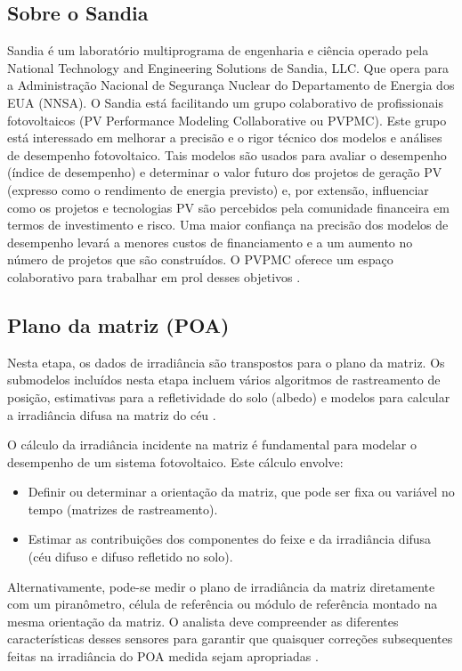 \subsection{Sobre o Sandia}

Sandia é um laboratório multiprograma de engenharia e ciência operado pela National Technology and Engineering Solutions de Sandia, LLC. Que opera para a Administração Nacional de Segurança Nuclear do Departamento de Energia dos EUA (NNSA). O Sandia está facilitando um grupo colaborativo de profissionais fotovoltaicos (PV Performance Modeling Collaborative ou PVPMC). Este grupo está interessado em melhorar a precisão e o rigor técnico dos modelos e análises de desempenho fotovoltaico. Tais modelos são usados para avaliar o desempenho (índice de desempenho) e determinar o valor futuro dos projetos de geração PV (expresso como o rendimento de energia previsto) e, por extensão, influenciar como os projetos e tecnologias PV são percebidos pela comunidade financeira em termos de investimento e risco. Uma maior confiança na precisão dos modelos de desempenho levará a menores custos de financiamento e a um aumento no número de projetos que são construídos. O PVPMC oferece um espaço colaborativo para trabalhar em prol desses objetivos \cite{sandia}.

\subsection{Plano da matriz (POA)}

Nesta etapa, os dados de irradiância são transpostos para o plano da matriz. Os submodelos incluídos nesta etapa incluem vários algoritmos de rastreamento de posição, estimativas para a refletividade do solo (albedo) e modelos para calcular a irradiância difusa na matriz do céu \cite{sandia}.

O cálculo da irradiância incidente na matriz é fundamental para modelar o desempenho de um sistema fotovoltaico. Este cálculo envolve:

\begin{itemize}
  \item Definir ou determinar a orientação da matriz, que pode ser fixa ou variável no tempo (matrizes de rastreamento).

  \item Estimar as contribuições dos componentes do feixe e da irradiância difusa (céu difuso e difuso refletido no solo).
\end{itemize}

Alternativamente, pode-se medir o plano de irradiância da matriz diretamente com um piranômetro, célula de referência ou módulo de referência montado na mesma orientação da matriz. O analista deve compreender as diferentes características desses sensores para garantir que quaisquer correções subsequentes feitas na irradiância do POA medida sejam apropriadas \cite{sandia}.

